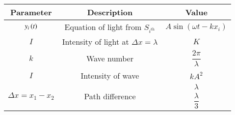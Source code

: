 \begin{tabular}{|c|c|c|}
\hline 
   \textbf{Parameter}  &\textbf{Description} &\textbf{Value} \\
\hline
$y_i\left(t\right)$ & Equation of light from $ S_{i^\text{th}}$ &  $A\sin(\omega t  - kx_i)$ \\
\hline
$I$ & Intensity of light at $\Delta x = \lambda$ &$K$ \\
\hline
$k $ & Wave number &$ \dfrac{2\pi}{\lambda}$  \\ 
\hline
$I $&  Intensity of wave  &$ kA^2$  \\
\hline
\multirow{3}{*}{$\Delta x = x_1 - x_2$} & \multirow{3}{*}{Path difference} & $\lambda$ \\
\cline {3-3}
& & $\dfrac{\lambda}{3}$ \\ 
\hline
\end{tabular}

